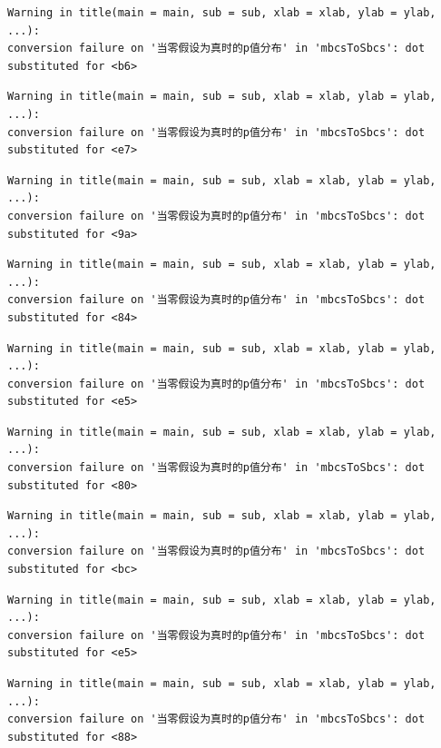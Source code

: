 \documentclass[
  letterpaper,
  DIV=11,
  numbers=noendperiod]{scrreprt}
\begin{document}
\begin{verbatim}
Warning in title(main = main, sub = sub, xlab = xlab, ylab = ylab, ...):
conversion failure on '当零假设为真时的p值分布' in 'mbcsToSbcs': dot
substituted for <b6>
\end{verbatim}

\begin{verbatim}
Warning in title(main = main, sub = sub, xlab = xlab, ylab = ylab, ...):
conversion failure on '当零假设为真时的p值分布' in 'mbcsToSbcs': dot
substituted for <e7>
\end{verbatim}

\begin{verbatim}
Warning in title(main = main, sub = sub, xlab = xlab, ylab = ylab, ...):
conversion failure on '当零假设为真时的p值分布' in 'mbcsToSbcs': dot
substituted for <9a>
\end{verbatim}

\begin{verbatim}
Warning in title(main = main, sub = sub, xlab = xlab, ylab = ylab, ...):
conversion failure on '当零假设为真时的p值分布' in 'mbcsToSbcs': dot
substituted for <84>
\end{verbatim}

\begin{verbatim}
Warning in title(main = main, sub = sub, xlab = xlab, ylab = ylab, ...):
conversion failure on '当零假设为真时的p值分布' in 'mbcsToSbcs': dot
substituted for <e5>
\end{verbatim}

\begin{verbatim}
Warning in title(main = main, sub = sub, xlab = xlab, ylab = ylab, ...):
conversion failure on '当零假设为真时的p值分布' in 'mbcsToSbcs': dot
substituted for <80>
\end{verbatim}

\begin{verbatim}
Warning in title(main = main, sub = sub, xlab = xlab, ylab = ylab, ...):
conversion failure on '当零假设为真时的p值分布' in 'mbcsToSbcs': dot
substituted for <bc>
\end{verbatim}

\begin{verbatim}
Warning in title(main = main, sub = sub, xlab = xlab, ylab = ylab, ...):
conversion failure on '当零假设为真时的p值分布' in 'mbcsToSbcs': dot
substituted for <e5>
\end{verbatim}

\begin{verbatim}
Warning in title(main = main, sub = sub, xlab = xlab, ylab = ylab, ...):
conversion failure on '当零假设为真时的p值分布' in 'mbcsToSbcs': dot
substituted for <88>
\end{verbatim}
\end{document}
